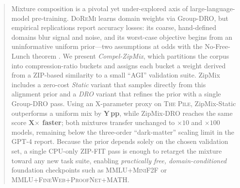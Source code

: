 \begin{abstract}
Mixture composition is a pivotal yet under-explored axis of large-language-model pre-training.
\textsc{DoReMi} learns domain weights via Group-DRO, but empirical replications report accuracy losses: its coarse, hand-defined domains blur signal and noise, and its worst-case objective begins from an uninformative uniform prior—two assumptions at odds with the No-Free-Lunch theorem \citep{wolpert1997no}.
We present \emph{Compel-ZipMix}, which partitions the corpus into compression-ratio buckets and assigns each bucket a weight derived from a ZIP-based similarity to a small ``AGI'' validation suite.
ZipMix includes a zero-cost \emph{Static} variant that samples directly from this alignment prior and a \emph{DRO} variant that refines the prior with a single Group-DRO pass.
Using an X-parameter proxy on \textsc{The Pile}, ZipMix-Static outperforms a uniform mix by \textbf{Y\,pp}, while ZipMix-DRO reaches the same score \textbf{X$\times$ faster}; both mixtures transfer unchanged to $\times10$ and $\times100$ models, remaining below the three-order ``dark-matter'' scaling limit in the GPT-4 report.
Because the prior depends solely on the chosen validation set, a single CPU-only ZIP-FIT pass is enough to retarget the mixture toward any new task suite, enabling \emph{practically free, domain-conditioned} foundation checkpoints such as \textsc{MMLU+MiniF2F} or \textsc{MMLU+FineWeb+ProofNet+MATH}.
\end{abstract}
